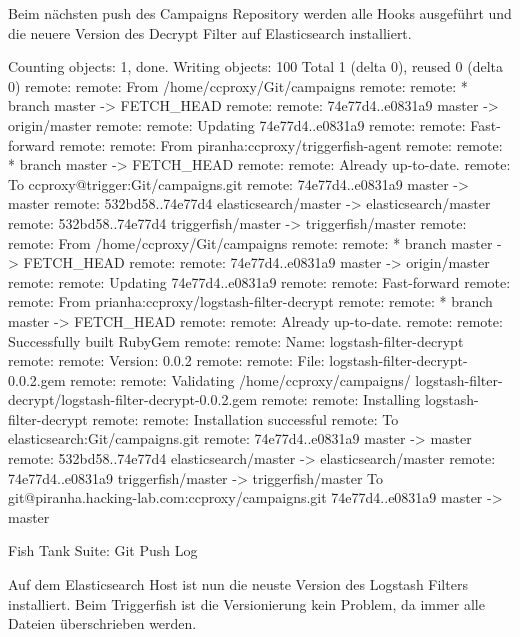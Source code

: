Beim nächsten push des Campaigns Repository werden alle Hooks ausgeführt und die neuere Version des Decrypt Filter auf Elasticsearch installiert.

\begin{listing}[H]
\begin{fancycode}
Counting objects: 1, done.
Writing objects: 100%
Total 1 (delta 0), reused 0 (delta 0)
remote: remote: From /home/ccproxy/Git/campaigns        
remote: remote:  * branch            master     -> FETCH_HEAD        
remote: remote:    74e77d4..e0831a9  master     -> origin/master        
remote: remote: Updating 74e77d4..e0831a9        
remote: remote: Fast-forward        
remote: remote: From piranha:ccproxy/triggerfish-agent        
remote: remote:  * branch            master     -> FETCH_HEAD        
remote: remote: Already up-to-date.        
remote: To ccproxy@trigger:Git/campaigns.git
remote:    74e77d4..e0831a9  master -> master
remote:    532bd58..74e77d4  elasticsearch/master -> elasticsearch/master
remote:    532bd58..74e77d4  triggerfish/master -> triggerfish/master
remote: remote: From /home/ccproxy/Git/campaigns        
remote: remote:  * branch            master     -> FETCH_HEAD        
remote: remote:    74e77d4..e0831a9  master     -> origin/master        
remote: remote: Updating 74e77d4..e0831a9        
remote: remote: Fast-forward        
remote: remote: From prianha:ccproxy/logstash-filter-decrypt        
remote: remote:  * branch            master     -> FETCH_HEAD        
remote: remote: Already up-to-date.        
remote: remote:   Successfully built RubyGem        
remote: remote:   Name: logstash-filter-decrypt        
remote: remote:   Version: 0.0.2        
remote: remote:   File: logstash-filter-decrypt-0.0.2.gem        
remote: remote: Validating /home/ccproxy/campaigns/
logstash-filter-decrypt/logstash-filter-decrypt-0.0.2.gem        
remote: remote: Installing logstash-filter-decrypt        
remote: remote: Installation successful               
remote: To elasticsearch:Git/campaigns.git
remote:    74e77d4..e0831a9  master -> master
remote:    532bd58..74e77d4  elasticsearch/master -> elasticsearch/master
remote:    74e77d4..e0831a9  triggerfish/master -> triggerfish/master
To git@piranha.hacking-lab.com:ccproxy/campaigns.git
   74e77d4..e0831a9  master -> master
\end{fancycode}
\caption{Fish Tank Suite: Git Push Log}
\label{lst:piranha-git-push-log}
\end{listing}

Auf dem Elasticsearch Host ist nun die neuste Version des Logstash Filters installiert. Beim Triggerfish ist die Versionierung kein Problem, da immer alle Dateien überschrieben werden.

